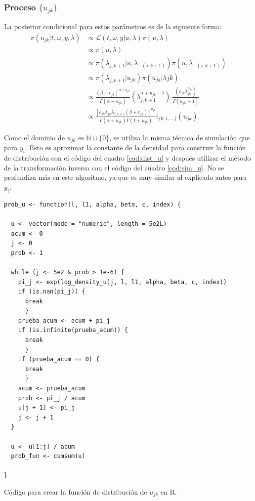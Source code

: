 \documentclass[11pt,a4paper]{article}
\begin{document}
\clearpage

\subsubsection*{Proceso $\lbrace u_{jk}\rbrace$}

La posterior condicional para estos parámetros es de la siguiente forma:
\begin{align*}
\pi(u_{jk} | t, \omega, y ,\lambda) &\propto \mathcal{L}(t, \omega, y | u, \lambda) \pi(u, \lambda)\\
&\propto \pi(u, \lambda)\\
&\propto \pi(\lambda_{j, k+1} | u, \lambda_{-(j, k+1)}) \pi(u, \lambda_{-(j, k+1)})\\
&\propto \pi(\lambda_{j, k+1} | u_{jk}) \pi(u_{jk}|\lambda{jk})\\
&\propto \frac{(\beta + c_{jk})^{\alpha + u_{jk}}}{\Gamma(\alpha + u_{jk})} \left(\lambda_{j, k+1}^{\alpha + u_{jk}-1}\right) \ \frac{\left(c_{jk}\lambda_{jk}^{u_{jk}}\right)}{\Gamma(u_{jk}+1)}\\
&\propto \frac{\left[c_{jk}\lambda_{jk}\lambda_{j, k+1}(\beta + c_{jk})\right]^{u_{jk}}}{\Gamma(\alpha + u_{jk})\Gamma(1 + u_{jk})}\mathbb{I}_{\lbrace 0, 1, \dots \rbrace}(u_{jk}).
\end{align*}

Como el dominio de $u_{jk}$ es $\mathbb{N}\cup \lbrace 0 \rbrace$, se utiliza la misma técnica de simulación que para $y_i$. Esto es aproximar la constante de la densidad para construir la función de distribución con el código del cuadro \ref{cod:dist_u} y después utilizar el método de la transformación inversa con el código del cuadro \ref{cod:sim_u}. No se profundiza más en este algoritmo, ya que es muy similar al explicado antes para $y_i$.

\begin{table}[!htb]
\begin{lstlisting}
prob_u <- function(l, l1, alpha, beta, c, index) {

  u <- vector(mode = "numeric", length = 5e2L)
  acum <- 0
  j <- 0
  prob <- 1

  while (j <= 5e2 & prob > 1e-6) {
    pi_j <- exp(log_density_u(j, l, l1, alpha, beta, c, index))
    if (is.nan(pi_j)) {
      break
      }
    prueba_acum <- acum + pi_j
    if (is.infinite(prueba_acum)) {
      break
      }
    if (prueba_acum == 0) {
      break
      }
    acum <- prueba_acum
    prob <- pi_j / acum
    u[j + 1] <- pi_j
    j <- j + 1
  }

  u <- u[1:j] / acum
  prob_fun <- cumsum(u)

}
\end{lstlisting}
\caption{Código para crear la función de distribución de $u_{jk}$ en R. }
\label{cod:dist_u}
\end{table}
\end{document}
